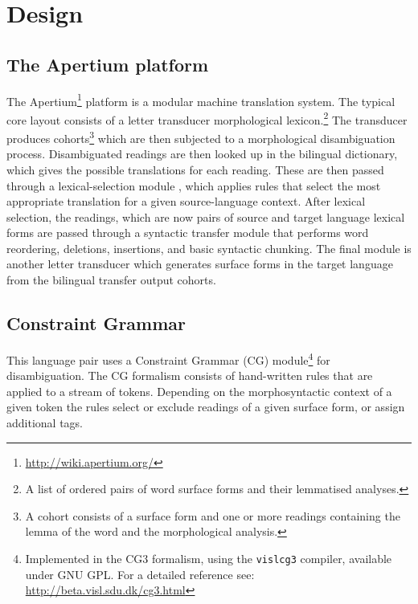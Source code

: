 \section{Design}
\subsection{The Apertium platform}
\nocite{forcada2011apertium}
The Apertium\footnote{\url{http://wiki.apertium.org/}} platform is a
modular machine translation system. The typical core layout consists
of a letter transducer morphological lexicon.\footnote{A list of
ordered pairs of word surface forms and their lemmatised
analyses.} The transducer produces cohorts\footnote{A cohort 
consists of a surface form and one or more readings containing the lemma of the 
word and the morphological analysis.} which are then subjected to a
morphological disambiguation process.
%
Disambiguated readings are then looked up in the bilingual dictionary,
which gives the possible translations for each reading. These
are then passed through a lexical-selection module \cite{tyers12a}, 
which applies rules that select the most appropriate translation
for a given source-language context.
After lexical selection, the readings, which are now pairs of source
and target language lexical forms are passed through a 
syntactic transfer module that performs word reordering, deletions,
insertions, and basic syntactic chunking.
%
The final module is another letter transducer which generates
surface forms in the target language from the bilingual transfer
output cohorts.

\subsection{Constraint Grammar}
This language pair uses a Constraint Grammar (CG)
module\footnote{Implemented in the CG3 formalism, using the
  \texttt{vislcg3} compiler, available under GNU GPL. For a detailed
  reference see: \url{http://beta.visl.sdu.dk/cg3.html}} for
disambiguation. The CG formalism consists of hand-written rules that
are applied to a stream of tokens. Depending on the morphosyntactic
context of a given token the rules select or exclude readings of a
given surface form, or assign additional tags.

